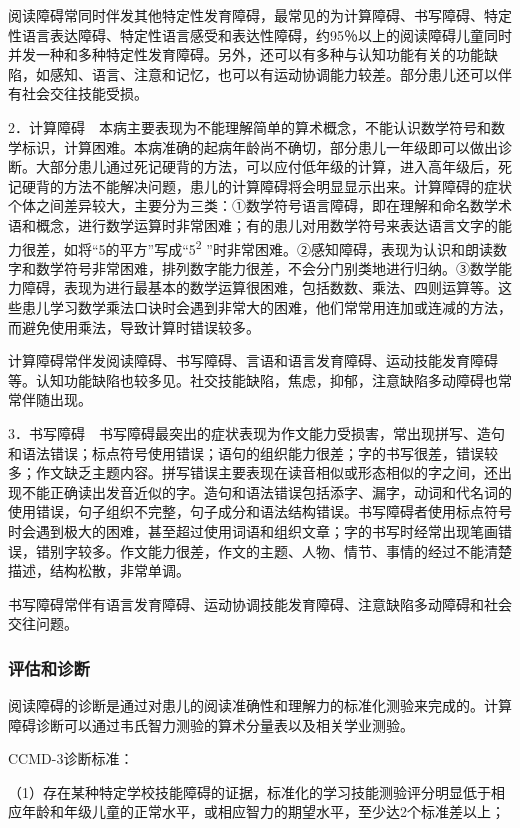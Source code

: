 阅读障碍常同时伴发其他特定性发育障碍，最常见的为计算障碍、书写障碍、特定性语言表达障碍、特定性语言感受和表达性障碍，约95％以上的阅读障碍儿童同时并发一种和多种特定性发育障碍。另外，还可以有多种与认知功能有关的功能缺陷，如感知、语言、注意和记忆，也可以有运动协调能力较差。部分患儿还可以伴有社会交往技能受损。

2．计算障碍　本病主要表现为不能理解简单的算术概念，不能认识数学符号和数学标识，计算困难。本病准确的起病年龄尚不确切，部分患儿一年级即可以做出诊断。大部分患儿通过死记硬背的方法，可以应付低年级的计算，进入高年级后，死记硬背的方法不能解决问题，患儿的计算障碍将会明显显示出来。计算障碍的症状个体之间差异较大，主要分为三类：①数学符号语言障碍，即在理解和命名数学术语和概念，进行数学运算时非常困难；有的患儿对用数学符号来表达语言文字的能力很差，如将“5的平方”写成“5\textsuperscript{2}
”时非常困难。②感知障碍，表现为认识和朗读数字和数学符号非常困难，排列数字能力很差，不会分门别类地进行归纳。③数学能力障碍，表现为进行最基本的数学运算很困难，包括数数、乘法、四则运算等。这些患儿学习数学乘法口诀时会遇到非常大的困难，他们常常用连加或连减的方法，而避免使用乘法，导致计算时错误较多。

计算障碍常伴发阅读障碍、书写障碍、言语和语言发育障碍、运动技能发育障碍等。认知功能缺陷也较多见。社交技能缺陷，焦虑，抑郁，注意缺陷多动障碍也常常伴随出现。

3．书写障碍　书写障碍最突出的症状表现为作文能力受损害，常出现拼写、造句和语法错误；标点符号使用错误；语句的组织能力很差；字的书写很差，错误较多；作文缺乏主题内容。拼写错误主要表现在读音相似或形态相似的字之间，还出现不能正确读出发音近似的字。造句和语法错误包括添字、漏字，动词和代名词的使用错误，句子组织不完整，句子成分和语法结构错误。书写障碍者使用标点符号时会遇到极大的困难，甚至超过使用词语和组织文章；字的书写时经常出现笔画错误，错别字较多。作文能力很差，作文的主题、人物、情节、事情的经过不能清楚描述，结构松散，非常单调。

书写障碍常伴有语言发育障碍、运动协调技能发育障碍、注意缺陷多动障碍和社会交往问题。

\subsubsection{评估和诊断}

阅读障碍的诊断是通过对患儿的阅读准确性和理解力的标准化测验来完成的。计算障碍诊断可以通过韦氏智力测验的算术分量表以及相关学业测验。

CCMD-3诊断标准：

（1）存在某种特定学校技能障碍的证据，标准化的学习技能测验评分明显低于相应年龄和年级儿童的正常水平，或相应智力的期望水平，至少达2个标准差以上；

